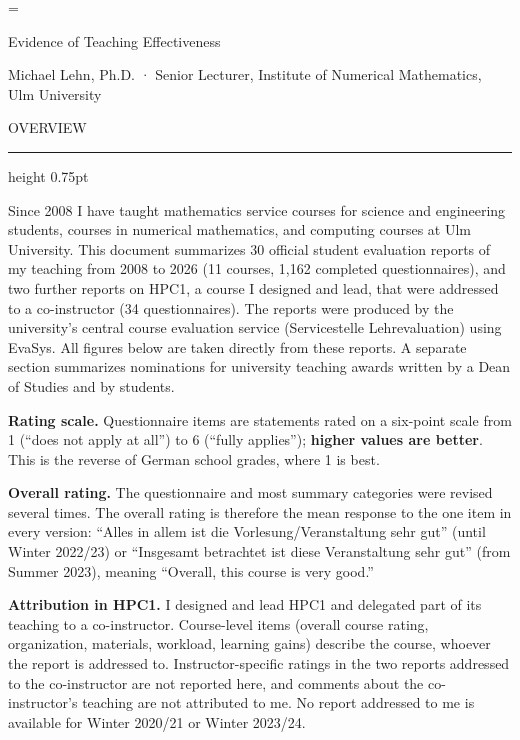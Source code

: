 \documentclass[10pt]{article}
\newcommand{\namesize}{\fontsize{16pt}{19.5pt}\selectfont}
\newcommand{\headsize}{\fontsize{10.5pt}{12.8pt}\selectfont}
\newcommand{\bodysize}{\fontsize{10pt}{12.2pt}\selectfont}
\newcommand{\cvsection}[1]{%
  \par\vspace{9pt}%
  {\headsize\bfseries\color{heading}\strut#1\par}%
  \nopagebreak\vspace{1pt}%
  {\color{rule}\hrule height 0.75pt}%
  \nopagebreak\vspace{3pt}%
  \prevdepth=2.7pt\relax
}
\newcommand{\para}[1]{{#1\par}\vspace{3pt}}
\begin{document}
\bodysize
\raggedright
{}
\frenchspacing
{}
\makeatletter
\@clubpenalty=\clubpenalty
\makeatother

{\centering
  {\namesize\bfseries\color{heading}\strut Evidence of Teaching Effectiveness\par}\vspace{2pt}
  {\headsize\color{tagline}Michael Lehn, Ph.D. · Senior Lecturer, Institute of Numerical Mathematics, Ulm University\par}\vspace{3pt}
}

\cvsection{OVERVIEW}

\para{Since 2008 I have taught mathematics service courses for science and engineering students, courses in numerical mathematics, and computing courses at Ulm University. This document summarizes 30 official student evaluation reports of my teaching from 2008 to 2026 (11 courses, 1,162 completed questionnaires), and two further reports on HPC1, a course I designed and lead, that were addressed to a co-instructor (34 questionnaires). The reports were produced by the university's central course evaluation service (Servicestelle Lehrevaluation) using EvaSys. All figures below are taken directly from these reports. A separate section summarizes nominations for university teaching awards written by a Dean of Studies and by students.}

\para{\textbf{Rating scale.} Questionnaire items are statements rated on a six-point scale from 1 (“does not apply at all”) to 6 (“fully applies”); \textbf{higher values are better}. This is the reverse of German school grades, where 1 is best.}

\para{\textbf{Overall rating.} The questionnaire and most summary categories were revised several times. The overall rating is therefore the mean response to the one item in every version: “Alles in allem ist die Vorlesung/Veranstaltung sehr gut” (until Winter 2022/23) or “Insgesamt betrachtet ist diese Veranstaltung sehr gut” (from Summer 2023), meaning “Overall, this course is very good.”}

\para{\textbf{Attribution in HPC1.} I designed and lead HPC1 and delegated part of its teaching to a co-instructor. Course-level items (overall course rating, organization, materials, workload, learning gains) describe the course, whoever the report is addressed to. Instructor-specific ratings in the two reports addressed to the co-instructor are not reported here, and comments about the co-instructor's teaching are not attributed to me. No report addressed to me is available for Winter 2020/21 or Winter 2023/24.}
\end{document}
